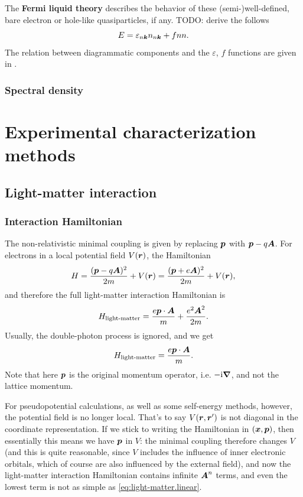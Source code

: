 \documentclass[hyperref, a4paper]{report}
\newcommand*{\ii}{\mathrm{i}}
\newcommand*{\concept}[1]{{\textbf{#1}}}
\begin{document}
The \concept{Fermi liquid theory} describes the behavior of these (semi-)well-defined, 
bare electron or hole-like quasiparticles, if any.  
TODO: derive the follows 
\begin{equation}
    E = \varepsilon_{n \vb*{k}} n_{n \vb*{k}} + f n n.
\end{equation}
The relation between diagrammatic components and the $\varepsilon$, $f$ functions 
are given in \cite{hedin1965new}.

\subsection{Spectral density}

\chapter{Experimental characterization methods}

\section{Light-matter interaction}

\subsection{Interaction Hamiltonian}

The non-relativistic minimal coupling is given by replacing $\vb*{p}$ with $\vb*{p} - q \vb*{A}$.
For electrons in a local potential field $V(\vb*{r})$, 
the Hamiltonian 
\begin{equation}
    H = \frac{(\vb*{p} - q \vb*{A})^2}{2m} + V(\vb*{r}) = \frac{(\vb*{p} + e \vb*{A})^2}{2m} + V(\vb*{r}),
\end{equation}
and therefore the full light-matter interaction Hamiltonian is 
\begin{equation}
    H_{\text{light-matter}} = \frac{e \vb*{p} \cdot \vb*{A}}{m} + \frac{e^2 \vb*{A}^2}{2m}.
\end{equation}
Usually, the double-photon process is ignored, and we get 
\begin{equation}
    H_{\text{light-matter}} = \frac{e \vb*{p} \cdot \vb*{A}}{m}.
    \label{eq:light-matter.linear}
\end{equation}
Note that here $\vb*{p}$ is the original momentum operator, i.e. $- \ii \grad$,
and not the lattice momentum.

For pseudopotential calculations, 
as well as some self-energy methods, 
however, the potential field is no longer local.
That's to say $V(\vb*{r}, \vb*{r}')$ is not diagonal in the coordinate representation.
If we stick to writing the Hamiltonian in $(\vb*{x}, \vb*{p})$,
then essentially this means we have $\vb*{p}$ in $V$:
the minimal coupling therefore changes $V$
(and this is quite reasonable,
since $V$ includes the influence of inner electronic orbitals,
which of course are also influenced by the external field),
and now the light-matter interaction Hamiltonian 
contains infinite $\vb*{A}^n$ terms,
and even the lowest term is not as simple as \eqref{eq:light-matter.linear}.
\end{document}

